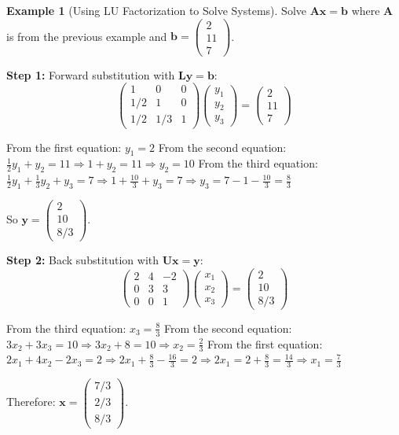 \documentclass[12pt]{article}
\numberwithin{equation}{section}
\newcommand{\vect}[1]{\boldsymbol{#1}}   %
\newcommand{\mat}[1]{\mathbf{#1}}        %
\theoremstyle{plain}
\theoremstyle{definition}
\newtheorem{example}[theorem]{Example}
\theoremstyle{remark}
\begin{document}
\begin{example}[Using LU Factorization to Solve Systems]
Solve $\mat{A}\vect{x} = \vect{b}$ where $\mat{A}$ is from the previous example and $\vect{b} = \begin{pmatrix} 2 \\ 11 \\ 7 \end{pmatrix}$.

\textbf{Step 1:} Forward substitution with $\mat{L}\vect{y} = \vect{b}$:
$$\begin{pmatrix} 1 & 0 & 0 \\ 1/2 & 1 & 0 \\ 1/2 & 1/3 & 1 \end{pmatrix}\begin{pmatrix} y_1 \\ y_2 \\ y_3 \end{pmatrix} = \begin{pmatrix} 2 \\ 11 \\ 7 \end{pmatrix}$$

From the first equation: $y_1 = 2$
From the second equation: $\frac{1}{2}y_1 + y_2 = 11 \Rightarrow 1 + y_2 = 11 \Rightarrow y_2 = 10$
From the third equation: $\frac{1}{2}y_1 + \frac{1}{3}y_2 + y_3 = 7 \Rightarrow 1 + \frac{10}{3} + y_3 = 7 \Rightarrow y_3 = 7 - 1 - \frac{10}{3} = \frac{8}{3}$

So $\vect{y} = \begin{pmatrix} 2 \\ 10 \\ 8/3 \end{pmatrix}$.

\textbf{Step 2:} Back substitution with $\mat{U}\vect{x} = \vect{y}$:
$$\begin{pmatrix} 2 & 4 & -2 \\ 0 & 3 & 3 \\ 0 & 0 & 1 \end{pmatrix}\begin{pmatrix} x_1 \\ x_2 \\ x_3 \end{pmatrix} = \begin{pmatrix} 2 \\ 10 \\ 8/3 \end{pmatrix}$$

From the third equation: $x_3 = \frac{8}{3}$
From the second equation: $3x_2 + 3x_3 = 10 \Rightarrow 3x_2 + 8 = 10 \Rightarrow x_2 = \frac{2}{3}$
From the first equation: $2x_1 + 4x_2 - 2x_3 = 2 \Rightarrow 2x_1 + \frac{8}{3} - \frac{16}{3} = 2 \Rightarrow 2x_1 = 2 + \frac{8}{3} = \frac{14}{3} \Rightarrow x_1 = \frac{7}{3}$

Therefore: $\vect{x} = \begin{pmatrix} 7/3 \\ 2/3 \\ 8/3 \end{pmatrix}$.
\end{example}
\end{document}
